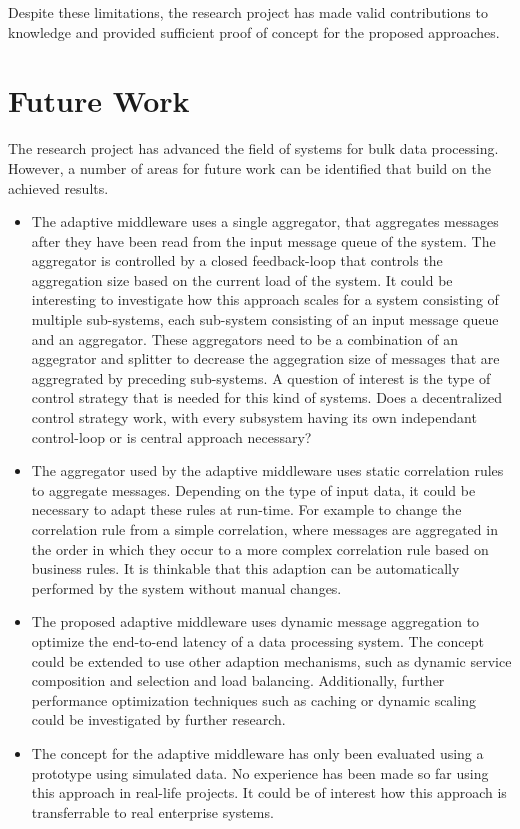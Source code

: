 Despite these limitations, the research project has made valid contributions to knowledge and provided sufficient proof of concept for the proposed approaches.

\section{Future Work}

The research project has advanced the field of systems for bulk data processing. However, a number of areas for future work can be identified that build on the achieved results.

\begin{itemize}
	\item The adaptive middleware uses a single aggregator, that aggregates messages after they have been read from the input message queue of the system. The aggregator is controlled by a closed feedback-loop that controls the aggregation size based on the current load of the system. It could be interesting to investigate how this approach scales for a system consisting of multiple sub-systems, each sub-system consisting of an input message queue and an aggregator. These aggregators need to be a combination of an aggegrator and splitter to decrease the aggegration size of messages that are aggregrated by preceding sub-systems. A question of interest is the type of control strategy that is needed for this kind of systems. Does a decentralized control strategy work, with every subsystem having its own independant control-loop or is central approach necessary?
	\item The aggregator used by the adaptive middleware uses static correlation rules to aggregate messages. Depending on the type of input data, it could be necessary to adapt these rules at run-time. For example to change the correlation rule from a simple correlation, where messages are aggregated in the order in which they occur to a more complex correlation rule based on business rules. It is thinkable that this adaption can be automatically performed by the system without manual changes. 
	\item The proposed adaptive middleware uses dynamic message aggregation to optimize the end-to-end latency of a data processing system. The concept could be extended to use other adaption mechanisms, such as dynamic service composition and selection and load balancing. Additionally, further performance optimization techniques such as caching or dynamic scaling could be investigated by further research.
	\item The concept for the adaptive middleware has only been evaluated using a prototype using simulated data. No experience has been made so far using this approach in real-life projects. It could be of interest how this approach is transferrable to real enterprise systems.
\end{itemize}